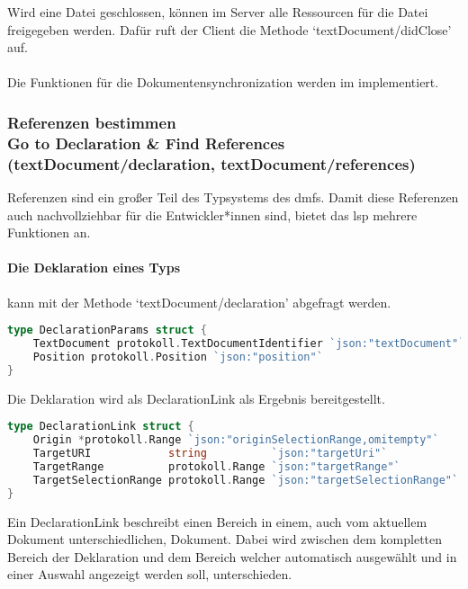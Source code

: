 \documentclass[./einleitung.tex]{subfiles}
\begin{document}
    Wird eine Datei geschlossen, können im Server alle Ressourcen für die Datei freigegeben werden.
    Dafür ruft der Client die Methode `textDocument/didClose' auf.
    \\\\
    Die Funktionen für die Dokumentensynchronization werden im  implementiert.

    \subsubsection[Referenzen bestimmen]{Referenzen bestimmen\\ {\textnormal{\footnotesize Go to Declaration \& Find References \\ (textDocument/declaration, textDocument/references) \cite{declaration} \cite{references}}}}\label{subsubsec:referenzen}
    Referenzen sind ein großer Teil des Typsystems des \acrshort{dmf}s.
    Damit diese Referenzen auch nachvollziehbar für die Entwickler*innen sind, bietet das \acrshort{lsp} mehrere Funktionen an.
    \paragraph{Die Deklaration eines Typs} kann mit der Methode `textDocument/declaration' abgefragt werden.
    \begin{lstlisting}[language=Go, title=Definition der Parameter, caption=Definition der Deklarations-Parameter, label=lst:declarationParams]
type DeclarationParams struct {
	TextDocument protokoll.TextDocumentIdentifier `json:"textDocument"`
	Position protokoll.Position `json:"position"`
}
    \end{lstlisting}
    Die Deklaration wird als DeclarationLink als Ergebnis bereitgestellt.
    \begin{lstlisting}[language=Go, title=Definition des DeclarationLink , label=lst:locationLink]
type DeclarationLink struct {
	Origin *protokoll.Range `json:"originSelectionRange,omitempty"`
	TargetURI            string          `json:"targetUri"`
	TargetRange          protokoll.Range `json:"targetRange"`
	TargetSelectionRange protokoll.Range `json:"targetSelectionRange"`
}
    \end{lstlisting}
    Ein DeclarationLink beschreibt einen Bereich in einem, auch vom aktuellem Dokument unterschiedlichen, Dokument.
    Dabei wird zwischen dem kompletten Bereich der Deklaration und dem Bereich welcher automatisch ausgewählt und in einer Auswahl angezeigt werden soll, unterschieden.
\end{document}
